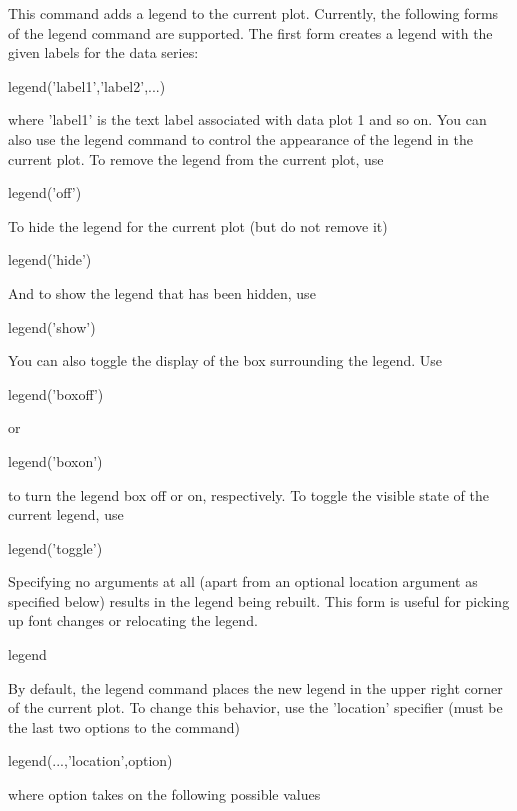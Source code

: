 This command adds a legend to the current plot. Currently, the following forms of the {\ttfamily legend} command are supported. The first form creates a legend with the given labels for the data series\-: \begin{DoxyVerb}  legend('label1','label2',...)
\end{DoxyVerb}
 where {\ttfamily 'label1'} is the text label associated with data plot 1 and so on. You can also use the {\ttfamily legend} command to control the appearance of the legend in the current plot. To remove the legend from the current plot, use \begin{DoxyVerb}  legend('off')
\end{DoxyVerb}
 To hide the legend for the current plot (but do not remove it) \begin{DoxyVerb}  legend('hide')
\end{DoxyVerb}
 And to show the legend that has been hidden, use \begin{DoxyVerb}  legend('show')
\end{DoxyVerb}
 You can also toggle the display of the box surrounding the legend. Use \begin{DoxyVerb}  legend('boxoff')
\end{DoxyVerb}
 or \begin{DoxyVerb}  legend('boxon')
\end{DoxyVerb}
 to turn the legend box off or on, respectively. To toggle the visible state of the current legend, use \begin{DoxyVerb}  legend('toggle')
\end{DoxyVerb}
 Specifying no arguments at all (apart from an optional location argument as specified below) results in the legend being rebuilt. This form is useful for picking up font changes or relocating the legend. \begin{DoxyVerb}  legend
\end{DoxyVerb}
 By default, the {\ttfamily legend} command places the new legend in the upper right corner of the current plot. To change this behavior, use the {\ttfamily 'location'} specifier (must be the last two options to the command) \begin{DoxyVerb}  legend(...,'location',option)
\end{DoxyVerb}
 where {\ttfamily option} takes on the following possible values 
